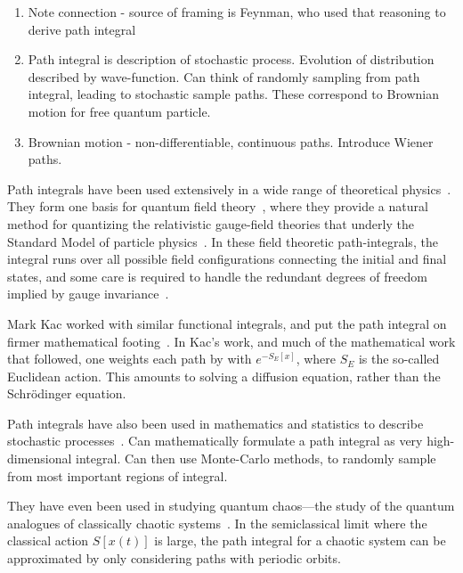     \begin{enumerate}
      \item Note connection - source of framing is Feynman, who used that reasoning to derive path
        integral
      \item Path integral is description of stochastic process.  Evolution of distribution described
        by wave-function.  Can think of randomly sampling from path integral, leading to stochastic 
        sample paths.  These correspond to Brownian motion for free quantum particle.  
      \item Brownian motion - non-differentiable, continuous paths.  Introduce Wiener paths.  
    \end{enumerate}
    
    Path integrals have been used extensively in a wide range of theoretical physics~\cite{Kleinert2012}.
    They form one basis for quantum field theory~\cite{Brown1994}, where they provide a 
    natural method for quantizing the relativistic gauge-field theories 
    that underly the Standard Model of particle physics~\cite{Srednicki2008}.
    In these field theoretic path-integrals, the integral runs over
    all possible field configurations connecting the initial and final states, and some care is required
    to handle the redundant degrees of freedom implied by gauge invariance~\cite{Faddeev1991}.

    Mark Kac worked with similar functional integrals, and put the path integral 
    on firmer mathematical footing~\cite{Kac1949}.  In Kac's work, and much of the mathematical
    work that followed, one weights each path
    by with $e^{-S_E[x]}$, where $S_E$ is the so-called Euclidean action.  
    This amounts to solving a diffusion equation, rather than the Schr\"odinger equation.  

    Path integrals have also been used in mathematics and statistics to describe stochastic 
    processes~\cite{Durrett1996, Karatzas1991}.  
    Can mathematically formulate a path integral as very high-dimensional integral.
    Can then use Monte-Carlo methods, to randomly sample from most important regions of integral.  

    They have even been used in studying quantum chaos---the study of the quantum analogues 
    of classically chaotic systems~\cite{Gutzwiller1990}.  In the semiclassical limit
    where the classical action $S[x(t)]$ is large, the path integral for a chaotic system
    can be approximated by only considering paths with periodic orbits.  

